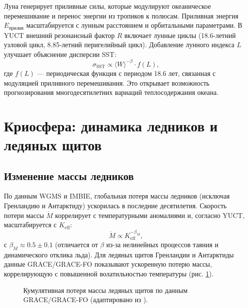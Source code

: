 \documentclass[12pt,a4paper]{article}
\newcommand{\Keff}{K_{\mathrm{eff}}}
\newcommand{\be}{\beta}
\begin{document}
	Луна генерирует приливные силы, которые модулируют океаническое перемешивание и перенос энергии из тропиков к полюсам. Приливная энергия \(E_{\text{прилив}}\) масштабируется с лунным расстоянием и орбитальными параметрами. В YUCT внешний резонансный фактор \(R\) включает лунные циклы (18.6-летний узловой цикл, 8.85-летний перигелийный цикл). Добавление лунного индекса \(L\) улучшает объяснение дисперсии SST:
	\[
	\sigma_{\text{SST}} \propto \langle W \rangle^{-\be} \cdot f(L),
	\]
	где \(f(L)\) — периодическая функция с периодом 18.6 лет, связанная с модуляцией приливного перемешивания. Это открывает возможность прогнозирования многодесятилетних вариаций теплосодержания океана.
	
	\section{Криосфера: динамика ледников и ледяных щитов}
	
	\subsection{Изменение массы ледников}
	
	По данным WGMS и IMBIE, глобальная потеря массы ледников (исключая Гренландию и Антарктиду) ускорилась в последние десятилетия. Скорость потери массы \(\dot{M}\) коррелирует с температурными аномалиями и, согласно YUCT, масштабируется с \(\Keff\):
	\[
	\dot{M} \propto \Keff^{-\beta_M},
	\]
	с \(\beta_M \approx 0.5 \pm 0.1\) (отличается от \(\be\) из-за нелинейных процессов таяния и динамического отклика льда). Для ледяных щитов Гренландии и Антарктиды данные GRACE/GRACE-FO показывают ускоренную потерю массы, коррелирующую с повышенной волатильностью температуры (рис. \ref{fig:grace}).
	
	\begin{figure}[htbp]
		\centering
		\caption{Кумулятивная потеря массы ледяных щитов по данным GRACE/GRACE-FO (адаптировано из \cite{IMBIE}).}
		\label{fig:grace}
	\end{figure}
	
\end{document}
